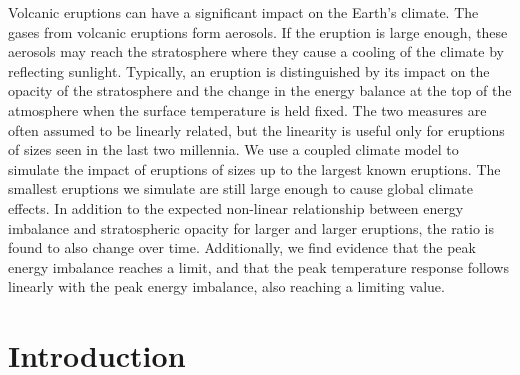 \documentclass[draft]{agujournal2019}
\begin{document}
  Volcanic eruptions can have a significant impact on the Earth's climate. The gases
  from volcanic eruptions form aerosols. If the eruption is large enough, these aerosols
  may reach the stratosphere where they cause a cooling of the climate by reflecting
  sunlight. Typically, an eruption is distinguished by its impact on the opacity of the
  stratosphere and the change in the energy balance at the top of the atmosphere when
  the surface temperature is held fixed. The two measures are often assumed to be
  linearly related, but the linearity is useful only for eruptions of sizes seen in the
  last two millennia. We use a coupled climate model to simulate the impact of eruptions
  of sizes up to the largest known eruptions. The smallest eruptions we simulate are
  still large enough to cause global climate effects. In addition to the expected
  non-linear relationship between energy imbalance and stratospheric opacity for larger
  and larger eruptions, the ratio is found to also change over time. Additionally, we
  find evidence that the peak energy imbalance reaches a limit, and that the peak
  temperature response follows linearly with the peak energy imbalance, also reaching a
  limiting value.


  \section{Introduction}

\end{document}
